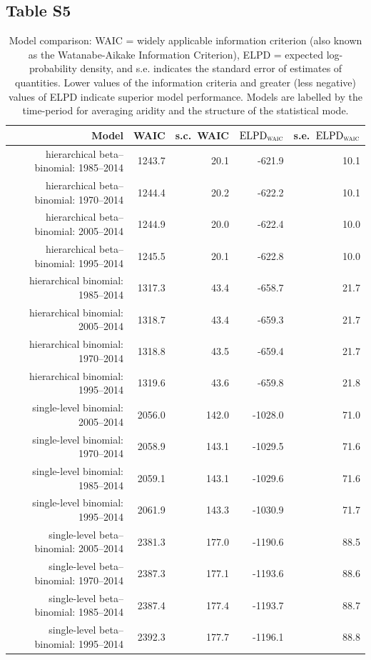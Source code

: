 \documentclass[draft]{agujournal}
\begin{document}
\subsection*{Table S5}
\begin{table}[H]
\centering
\begin{tabular}{rrrrr}
  \hline
Model & WAIC & s.c.\ WAIC & $\text{ELPD}_{\text{\scshape{waic}}}$ & s.e.\ $\text{ELPD}_{\text{\scshape{waic}}}$ \\
  \hline
hierarchical beta--binomial: 1985--2014 & 1243.7 & 20.1 & -621.9 & 10.1 \\
  hierarchical beta--binomial: 1970--2014 & 1244.4 & 20.2 & -622.2 & 10.1 \\
  hierarchical beta--binomial: 2005--2014 & 1244.9 & 20.0 & -622.4 & 10.0 \\
  hierarchical beta--binomial: 1995--2014 & 1245.5 & 20.1 & -622.8 & 10.0 \\
  hierarchical binomial: 1985--2014 & 1317.3 & 43.4 & -658.7 & 21.7 \\
  hierarchical binomial: 2005--2014 & 1318.7 & 43.4 & -659.3 & 21.7 \\
  hierarchical binomial: 1970--2014 & 1318.8 & 43.5 & -659.4 & 21.7 \\
  hierarchical binomial: 1995--2014 & 1319.6 & 43.6 & -659.8 & 21.8 \\
  single-level binomial: 2005--2014 & 2056.0 & 142.0 & -1028.0 & 71.0 \\
  single-level binomial: 1970--2014 & 2058.9 & 143.1 & -1029.5 & 71.6 \\
  single-level binomial: 1985--2014 & 2059.1 & 143.1 & -1029.6 & 71.6 \\
  single-level binomial: 1995--2014 & 2061.9 & 143.3 & -1030.9 & 71.7 \\
  single-level beta--binomial: 2005--2014 & 2381.3 & 177.0 & -1190.6 & 88.5 \\
  single-level beta--binomial: 1970--2014 & 2387.3 & 177.1 & -1193.6 & 88.6 \\
  single-level beta--binomial: 1985--2014 & 2387.4 & 177.4 & -1193.7 & 88.7 \\
  single-level beta--binomial: 1995--2014 & 2392.3 & 177.7 & -1196.1 & 88.8 \\
   \hline
\end{tabular}
\caption[Model comparison: WAIC (climatological interval).]{Model comparison: WAIC = widely applicable information criterion (also known as the Watanabe-Aikake Information Criterion), ELPD = expected log-probability density, and s.e. indicates the standard error of estimates of quantities. Lower values of the information criteria and greater (less negative) values of ELPD indicate superior model performance. Models are labelled by the time-period for averaging aridity and the structure of the statistical mode.}
\label{tab:waic.years}
\end{table}
\end{document}
